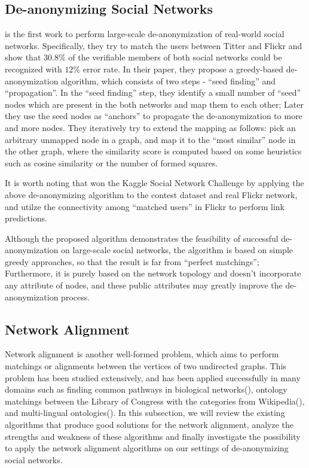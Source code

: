 \documentclass[11pt,letterpaper]{article}
\begin{document}
\subsection{De-anonymizing Social Networks}

\cite{Narayanan2009} is the first work to perform large-scale de-anonymization of real-world social networks. Specifically, they try to match the users between Titter and Flickr and show that $30.8\%$ of the verifiable members of both social networks could be recognized with $12\%$ error rate. In their paper, they propose a greedy-based de-anonymization algorithm, which consists of two steps - ``seed finding'' and ``propagation''. In the ``seed finding'' step, they identify a small number of ``seed'' nodes which are present in the both networks and map them to each other; Later they use the seed nodes as ``anchors'' to propagate the de-anonymization to more and more nodes. They iteratively try to extend the mapping as follows: pick an arbitrary unmapped node in a graph, and map it to the ``most similar'' node in the other graph, where the similarity score is computed based on some heuristics such as cosine similarity or the number of formed squares.

It is worth noting that \cite{Narayanan2011} won the Kaggle Social Network Challenge by applying the above de-anonymizing algorithm to the contest dataset and real Flickr network, and utilze the connectivity among ``matched users'' in Flickr to perform link predictions. 

Although the proposed algorithm demonstrates the feasibility of successful de-anonymization on large-scale social networks, the algorithm is based on simple greedy approaches, so that the result is far from ``perfect matchings''; Furthermore, it is purely based on the network topology and doesn't incorporate any attribute of nodes, and these public attributes may greatly improve the de-anonymization process.

\subsection{Network Alignment}
Network alignment is another well-formed problem, which aims to perform matchings or alignments between the vertices of two undirected graphs. This problem has been studied extensively, and has been applied successfully in many domains such as finding common pathways in biological networks(\cite{Singh2007, Singh2008, Liao2009}), ontology matchings between the Library of Congress with the categories from Wikipedia(\cite{Bayati2009}), and multi-lingual ontologies(\cite{Kreitmann2011, Bayati2009a}). In this subsection, we will review the existing algorithms that produce good solutions for the network alignment, analyze the strengths and weakness of these algorithms and finally investigate the possibility to apply the network alignment algorithms on our settings of de-anonymizing social networks.
 
\end{document}
